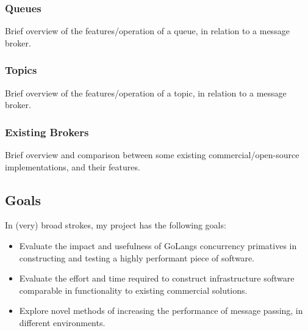 \subsubsection{Queues}
\label{subs:Queues}

Brief overview of the features/operation of a queue, in relation to a message broker.


\subsubsection{Topics}
\label{subs:Topics}

Brief overview of the features/operation of a topic, in relation to a message broker.

\subsubsection{Existing Brokers}
\label{subs:Existing Brokers}

Brief overview and comparison between some existing commercial/open-source
implementations, and their features.

\subsection{Goals}
 In (very) broad strokes, my project has the following goals:

 \begin{itemize}
   \item Evaluate the impact and usefulness of GoLangs concurrency primatives in
   constructing and testing a highly performant piece of software.
   \item Evaluate the effort and time required to construct infrastructure
   software comparable in functionality to existing commercial solutions.
   \item Explore novel methods of increasing the performance of message passing,
   in different environments.
 \end{itemize}
